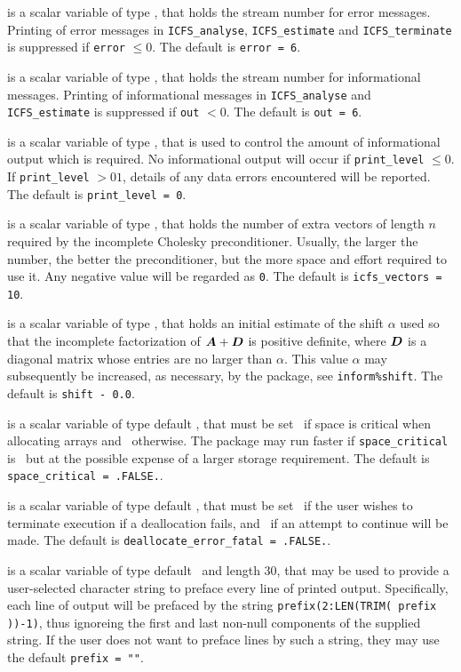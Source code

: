 \documentclass{galahad}
\newcommand{\packagename}{ICFS}
\begin{document}
\begin{description}

 is a scalar variable of type \integer, that holds the
stream number for error messages. Printing of error messages in
{\tt \packagename\_analyse},
{\tt \packagename\_estimate}
and {\tt \packagename\_terminate}
is suppressed if {\tt error} $\leq 0$.
The default is {\tt error = 6}.

 is a scalar variable of type \integer, that holds the
stream number for informational messages. Printing of informational messages in
{\tt \packagename\_analyse} and {\tt \packagename\_estimate}
is suppressed if {\tt out} $< 0$.
The default is {\tt out = 6}.

 is a scalar variable of type \integer, that is used
to control the amount of informational output which is required. No
informational output will occur if {\tt print\_level} $\leq 0$. If
{\tt print\_level} $> 01$, details of any data errors encountered
will be reported.
The default is {\tt print\_level = 0}.

 is a scalar variable of type \integer, that holds
the number of extra vectors of length $n$ required by the
incomplete Cholesky preconditioner.
Usually, the larger the number, the
better the preconditioner, but the more space and effort required to
use it. Any negative value will be regarded as {\tt 0}.
The default is {\tt icfs\_vectors = 10}.

 is a scalar variable of type \realdp, that holds
an initial estimate of the shift $\alpha$ used so that the incomplete
factorization of ${\bm{A}} + {\bm{D}}$ is positive definite, where ${\bm{D}}$ is
a diagonal matrix whose entries are no larger than $\alpha$.
This value $\alpha$ may subsequently be increased, as necessary, by the
package, see {\tt inform\%shift}.
The default is {\tt shift - 0.0}.

 is a scalar variable of type default \logical,
that must be set \true\ if space is critical when allocating arrays
and  \false\ otherwise. The package may run faster if
{\tt space\_critical} is \false\ but at the possible expense of a larger
storage requirement. The default is {\tt space\_critical = .FALSE.}.

 is a scalar variable of type default \logical,
that must be set \true\ if the user wishes to terminate execution if
a deallocation  fails, and \false\ if an attempt to continue
will be made. The default is {\tt deallocate\_error\_fatal = .FALSE.}.

 is a scalar variable of type default \character\
and length 30, that may be used to provide a user-selected
character string to preface every line of printed output.
Specifically, each line of output will be prefaced by the string
{\tt prefix(2:LEN(TRIM( prefix ))-1)},
thus ignoreing the first and last non-null components of the
supplied string. If the user does not want to preface lines by such
a string, they may use the default {\tt prefix = ""}.

\end{description}
\end{document}
